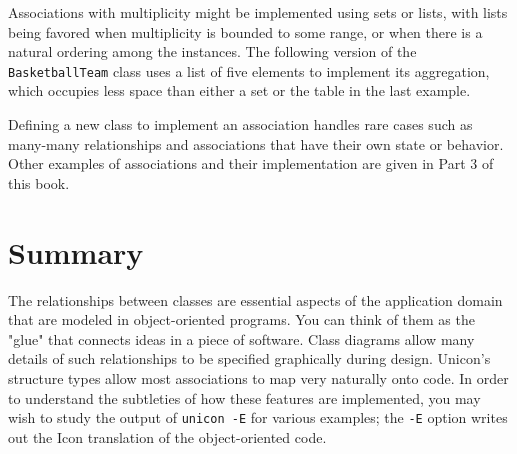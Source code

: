 
Associations with multiplicity might be implemented using sets or lists,
with lists being favored when multiplicity is bounded to some range, or
when there is a natural ordering among the instances. The following
version of the \texttt{BasketballTeam} class uses a list of five
elements to implement its aggregation, which occupies less space than
either a set or the table in the last example.


Defining a new class to implement an association handles
rare cases such as many-many relationships and associations that have
their own state or behavior. Other examples of associations and
their implementation are given in Part 3 of this book.

\section{Summary}

The relationships between classes are essential aspects of the
application domain that are modeled in object-oriented programs. You
can think of them as the "glue" that
connects ideas in a piece of software. Class diagrams allow many
details of such relationships to be specified graphically during
design. Unicon's structure types allow most
associations to map very naturally onto code.  In order
to understand the subtleties of how these features are implemented, you
may wish to study the output of \texttt{unicon -E} for various examples;
the \texttt{-E} option writes out the Icon translation of the
object-oriented code. 
\clearpage
\bigskip
